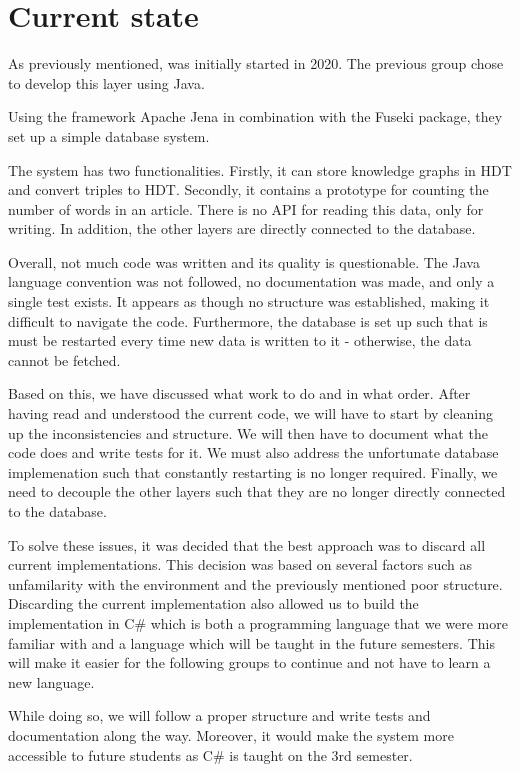 \section{Current state}

As previously mentioned, \knox{} was initially started in 2020.
The previous group chose to develop this layer using Java.

Using the framework Apache Jena in combination with the Fuseki package, they set up a simple database system.

The system has two functionalities. 
Firstly, it can store knowledge graphs in HDT and convert triples to HDT.
Secondly, it contains a prototype for counting the number of words in an article.
There is no API for reading this data, only for writing. 
In addition, the other layers are directly connected to the database.

Overall, not much code was written and its quality is questionable. 
The Java language convention was not followed, no documentation was made, and only a single test exists. 
It appears as though no structure was established, making it difficult to navigate the code. 
Furthermore, the database is set up such that is must be restarted every time new data is written to it - otherwise, the data cannot be fetched.

Based on this, we have discussed what work to do and in what order.
After having read and understood the current code, we will have to start by cleaning up the inconsistencies and structure.
We will then have to document what the code does and write tests for it.
We must also address the unfortunate database implemenation such that constantly restarting is no longer required.
Finally, we need to decouple the other layers such that they are no longer directly connected to the database.

To solve these issues, it was decided that the best approach was to discard all current implementations. This decision was based on several factors such as unfamilarity with the environment and the previously mentioned poor structure. Discarding the current implementation also allowed us to build the implementation in C# which is both a programming language that we were more familiar with and a language which will be taught in the future semesters. This will make it easier for the following groups to continue and not have to learn a new language.

While doing so, we will follow a proper structure and write tests and documentation along the way. 
Moreover, it would make the system more accessible to future students as C# is taught on the 3rd semester.  
